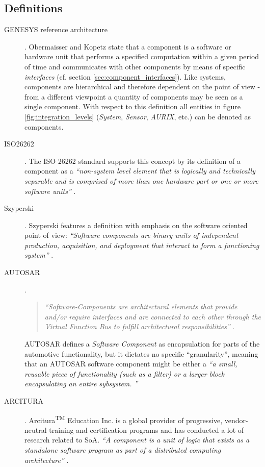 \subsection{Definitions}

\begin{description}
	\item [GENESYS reference architecture] .
	Obermaisser and Kopetz state that a component is a software or hardware unit that performs a specified computation within a given period of time \cite[p.38]{genesys} and communicates with other components by means of specific \emph{interfaces} (cf. section \ref{sec:component_interfaces}). Like systems, components are hierarchical and therefore dependent on the point of view - from a different viewpoint a quantity of components may be seen as a single component. With respect to this definition all entities in figure \ref{fig:integration_levels} (\emph{System}, \emph{Sensor}, \emph{AURIX}, etc.) can be denoted as components.

	\item [ISO26262] .
	The ISO 26262 standard supports this concept by its definition of a component as a \emph{``non-system level element that is logically and technically separable and is comprised of more than one hardware part or one or more software units''} \cite{iso26262:1}.

	\item [Szyperski].
	Szyperski features a definition with emphasis on the software oriented point of view: \emph{``Software components are binary units of independent production, acquisition, and deployment that interact to form a functioning system''} \cite[p.xxi]{szyperski}.

	\item [AUTOSAR].
	\begin{quote}
	\emph{``Software-Components are architectural elements that provide and/or require interfaces and are connected to each other through the Virtual Function Bus to fulfill architectural responsibilities''} \cite{autosar_glossary}.
	\end{quote}

	AUTOSAR defines a \emph{Software Component} as encapsulation for parts of the automotive functionality, but it dictates no specific ``granularity'', meaning that an AUTOSAR software component might be either a \emph{``a small, reusable piece of functionality (such as a filter) or a larger block encapsulating an entire sybsystem. \cite{autosar}''}

	\item [ARCITURA].
	Arcitura\textsuperscript{TM} Education Inc. is a global provider of progressive, vendor-neutral training and certification programs and has conducted a lot of research related to SoA.
	\emph{``A component is a unit of logic that exists as a standalone software program as part of a distributed computing architecture''} \cite{arcitura}.
 \end{description}


